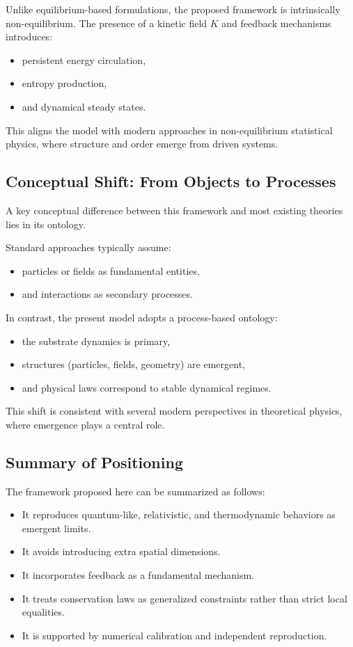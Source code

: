 \documentclass[11pt]{article}
\begin{document}
Unlike equilibrium-based formulations, the proposed framework is intrinsically non-equilibrium. The presence of a kinetic field $K$ and feedback mechanisms introduces:

\begin{itemize}
\item persistent energy circulation,
\item entropy production,
\item and dynamical steady states.
\end{itemize}

This aligns the model with modern approaches in non-equilibrium statistical physics, where structure and order emerge from driven systems.

\subsection{Conceptual Shift: From Objects to Processes}

A key conceptual difference between this framework and most existing theories lies in its ontology.

Standard approaches typically assume:
\begin{itemize}
\item particles or fields as fundamental entities,
\item and interactions as secondary processes.
\end{itemize}

In contrast, the present model adopts a process-based ontology:
\begin{itemize}
\item the substrate dynamics is primary,
\item structures (particles, fields, geometry) are emergent,
\item and physical laws correspond to stable dynamical regimes.
\end{itemize}

This shift is consistent with several modern perspectives in theoretical physics, where emergence plays a central role.

\subsection{Summary of Positioning}

The framework proposed here can be summarized as follows:

\begin{itemize}
\item It reproduces quantum-like, relativistic, and thermodynamic behaviors as emergent limits.
\item It avoids introducing extra spatial dimensions.
\item It incorporates feedback as a fundamental mechanism.
\item It treats conservation laws as generalized constraints rather than strict local equalities.
\item It is supported by numerical calibration and independent reproduction.
\end{itemize}
\end{document}
